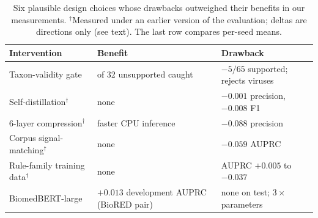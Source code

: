 \documentclass[11pt]{article}
\begin{document}
\begin{table}[ht]\centering\small
\setlength{\tabcolsep}{3pt}
\begin{tabular}{@{}l>{\raggedright\arraybackslash}p{}>{\raggedright\arraybackslash}p{}@{}}
\toprule
Intervention & Benefit & Drawback \\
\midrule
Taxon-validity gate & 1 of 32 unsupported caught & $-5/65$ supported; rejects viruses \\
Self-distillation$^\dagger$ & none & $-0.001$ precision, $-0.008$ F1 \\
6-layer compression$^\dagger$ & faster CPU inference & $-0.088$ precision \\
Corpus signal-matching$^\dagger$ & none & $-0.059$ AUPRC \\
Rule-family training data$^\dagger$ & none & AUPRC $+0.005$ to $-0.037$ \\
BiomedBERT-large & $+0.013$ development AUPRC (BioRED pair) & none on test; $3\times$ parameters \\
\bottomrule
\end{tabular}
\caption{Six plausible design choices whose drawbacks outweighed their benefits in our measurements. $^\dagger$Measured under an earlier
version of the evaluation; deltas are directions only (see text). The last row compares per-seed means.}
\label{tab:negative}
\end{table}
\end{document}
